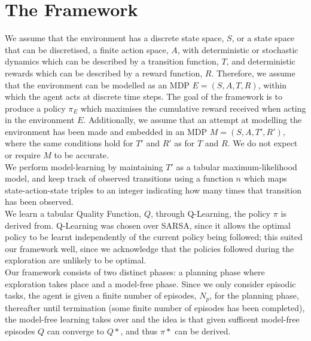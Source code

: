 \section{The Framework}
We assume that the environment has a discrete state space, $S$, or a state space that can be discretised, a finite action space, $A$, with deterministic or stochastic dynamics which can be described by a transition function, $T$, and deterministic rewards which can be described by a reward function, $R$. Therefore, we assume that the environment can be modelled as an MDP $E = (S, A, T, R)$, within which the agent acts at discrete time steps. The goal of the framework is to produce a policy $\pi_E$ which maximises the cumulative reward received when acting in the environment $E$.
Additionally, we assume that an attempt at modelling the environment has been made and embedded in an MDP $M = (S, A, T', R')$, where the same conditions hold for $T'$ and $R'$ as for $T$ and $R$. We do not expect or require $M$ to be accurate. 
\\We perform model-learning by maintaining $T'$ as a tabular maximum-likelihood model, and keep track of observed transitions using a function $n$ which maps state-action-state triples to an integer indicating how many times that transition has been observed.
\\We learn a tabular Quality Function, $Q$, through Q-Learning, the policy $\pi$ is derived from. Q-Learning was chosen over SARSA, since it allows the optimal policy to be learnt independently of the current policy being followed; this suited our framework well, since we acknowledge that the policies followed during the exploration are unlikely to be optimal.
\\Our framework consists of two distinct phases: a planning phase where exploration takes place and a model-free phase. Since we only consider episodic tasks, the agent is given a finite number of episodes, $N_p$, for the planning phase, thereafter until termination (some finite number of episodes has been completed), the model-free learning takes over and the idea is that given sufficent model-free episodes $Q$ can converge to $Q*$, and thus $\pi*$ can be derived.
